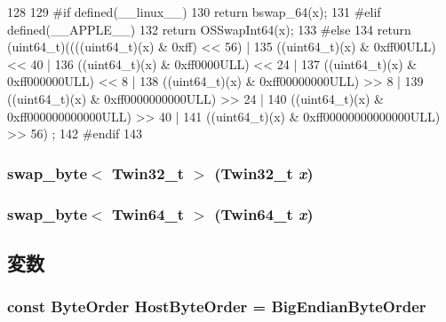 \begin{DoxyCode}
128 {
129 #if defined(__linux__)
130     return bswap_64(x);
131 #elif defined(__APPLE__)
132     return OSSwapInt64(x);
133 #else
134     return  (uint64_t)((((uint64_t)(x) & 0xff) << 56) |
135             ((uint64_t)(x) & 0xff00ULL) << 40 |
136             ((uint64_t)(x) & 0xff0000ULL) << 24 |
137             ((uint64_t)(x) & 0xff000000ULL) << 8 |
138             ((uint64_t)(x) & 0xff00000000ULL) >> 8 |
139             ((uint64_t)(x) & 0xff0000000000ULL) >> 24 |
140             ((uint64_t)(x) & 0xff000000000000ULL) >> 40 |
141             ((uint64_t)(x) & 0xff00000000000000ULL) >> 56) ;
142 #endif
143 }
\end{DoxyCode}
\hypertarget{byteswap_8hh_aced9dadb2c01690723d40d5b3a602776}{
\subsubsection[{swap\_\-byte$<$ Twin32\_\-t $>$}]{ swap\_\-byte$<$ {\bf Twin32\_\-t} $>$ ({\bf Twin32\_\-t} {\em x})}}
\label{byteswap_8hh_aced9dadb2c01690723d40d5b3a602776}
\hypertarget{byteswap_8hh_aed089e6a02d56dd35d6f651216ef9d1a}{
\subsubsection[{swap\_\-byte$<$ Twin64\_\-t $>$}]{ swap\_\-byte$<$ {\bf Twin64\_\-t} $>$ ({\bf Twin64\_\-t} {\em x})}}
\label{byteswap_8hh_aed089e6a02d56dd35d6f651216ef9d1a}


\subsection{変数}
\hypertarget{byteswap_8hh_aba38c3d743ff1a4568a9aa84a4843326}{
\subsubsection[{HostByteOrder}]{\setlength{\rightskip}{0pt plus 5cm}const {\bf ByteOrder} {\bf HostByteOrder} = BigEndianByteOrder}}
\label{byteswap_8hh_aba38c3d743ff1a4568a9aa84a4843326}
